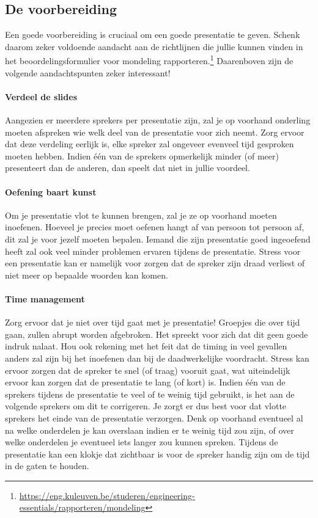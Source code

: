 \documentclass[a4paper]{article}
\begin{document}
\subsection{De voorbereiding}

Een goede voorbereiding is cruciaal om een goede presentatie te geven.
Schenk daarom zeker voldoende aandacht aan de richtlijnen die jullie kunnen vinden in het beoordelingsformulier voor mondeling rapporteren.\footnote{\url{https://eng.kuleuven.be/studeren/engineering-essentials/rapporteren/mondeling}}
Daarenboven zijn de volgende aandachtspunten zeker interessant!


\paragraph{Verdeel de slides}

Aangezien er meerdere sprekers per presentatie zijn, zal je op voorhand onderling moeten afspreken wie welk deel van de presentatie voor zich neemt.
Zorg ervoor dat deze verdeling eerlijk is, elke spreker zal ongeveer evenveel tijd gesproken moeten hebben.
Indien \'e\'en van de sprekers opmerkelijk minder (of meer) presenteert dan de anderen, dan speelt dat niet in jullie voordeel.


\paragraph{Oefening baart kunst}

Om je presentatie vlot te kunnen brengen, zal je ze op voorhand moeten inoefenen.
Hoeveel je precies moet oefenen hangt af van persoon tot persoon af, dit zal je voor jezelf moeten bepalen.
Iemand die zijn presentatie goed ingeoefend heeft zal ook veel minder problemen ervaren tijdens de presentatie.
Stress voor een presentatie kan er namelijk voor zorgen dat de spreker zijn draad verliest of niet meer op bepaalde woorden kan komen.


\paragraph{Time management}

Zorg ervoor dat je niet over tijd gaat met je presentatie!
Groepjes die over tijd gaan, zullen abrupt worden afgebroken.
Het spreekt voor zich dat dit geen goede indruk nalaat.
Hou ook rekening met het feit dat de timing in veel gevallen anders zal zijn bij het inoefenen dan bij de daadwerkelijke voordracht.
Stress kan ervoor zorgen dat de spreker te snel (of traag) vooruit gaat, wat uiteindelijk ervoor kan zorgen dat de presentatie te lang (of kort) is.
Indien \'e\'en van de sprekers tijdens de presentatie te veel of te weinig tijd gebruikt, is het aan de volgende sprekers om dit te corrigeren.
Je zorgt er dus best voor dat vlotte sprekers het einde van de presentatie verzorgen.
Denk op voorhand eventueel al na welke onderdelen je kan overslaan indien er te weinig tijd zou zijn, of over welke onderdelen je eventueel iets langer zou kunnen spreken.
Tijdens de presentatie kan een klokje dat zichtbaar is voor de spreker handig zijn om de tijd in de gaten te houden.
\end{document}
